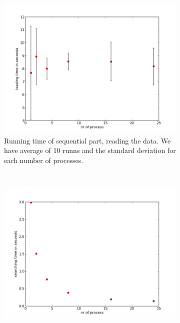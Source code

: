 \documentclass[a4paper,10pt]{article}
\begin{document}
\begin{figure}[h!t]
        \centering
        \begin{subfigure}[b]{0.70\textwidth}
                \centering
                \includegraphics[width=\textwidth]{graphics/mpio2gb_take2/load_time.png}
                \caption{Running time of sequential part, reading the data. 
                         We have average of 10 runns and the standard deviation for each number
                         of processes.}
                \label{fig:mpio2_load}
        \end{subfigure}%
        \\
        \begin{subfigure}[b]{0.70\textwidth}
                \centering
                \includegraphics[width=\textwidth]{graphics/mpio2gb_take2/search_time.png}

\end{subfigure}
\end{figure}
\end{document}
